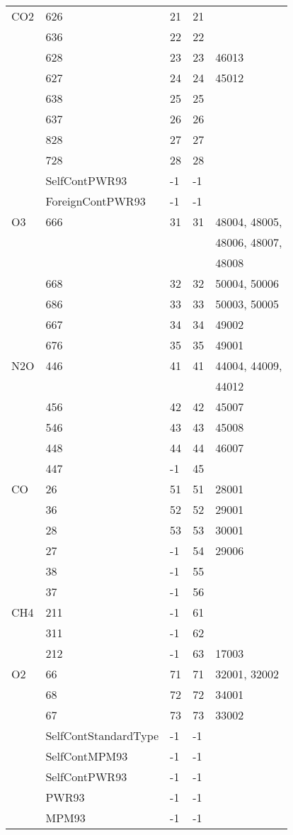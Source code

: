 \begin{longtable}{lllll}
\hline                  
  CO2& 626&  21&    21&\\
     & 636&  22&    22&\\
     & 628&  23&    23&  46013\\
     & 627&  24&    24&  45012\\
     & 638&  25&    25&\\
     & 637&  26&    26&\\
     & 828&  27&    27&\\
     & 728&  28&    28&\\
     &SelfContPWR93&    -1&-1&\\
     &ForeignContPWR93& -1&-1&\\
\hline                  
  O3& 666&  31&    31&  48004, 48005,\\
    &    &    &      &  48006, 48007,\\
    &    &    &      &  48008\\
    & 668&  32&    32&  50004, 50006\\
    & 686&  33&    33&  50003, 50005\\
    & 667&  34&    34&  49002\\
    & 676&  35&    35&  49001\\
\hline                  
  N2O& 446&  41&    41&  44004, 44009,\\
     &    &    &      &  44012\\
     & 456&  42&    42&  45007\\
     & 546&  43&    43&  45008\\
     & 448&  44&    44&  46007\\
     & 447&  -1&    45&\\
\hline                   
  CO&   26&  51&    51&  28001\\
    & 36&  52&    52&  29001\\
    & 28&  53&    53&  30001\\
    & 27&  -1&    54&  29006\\
    & 38&  -1&    55&\\
    & 37&  -1&    56&\\
\hline                  
  CH4& 211&  -1&    61&\\
     & 311&  -1&    62&\\
     & 212&  -1&    63&  17003\\
\hline                  
  O2& 66&  71&    71&  32001, 32002\\
    & 68&  72&    72&  34001\\
    & 67&  73&    73&  33002\\
    &SelfContStandardType&   -1        &-1&     \\
    &SelfContMPM93&          -1        &-1&     \\
    &SelfContPWR93&          -1        &-1&     \\
    &PWR93&                  -1        &-1&     \\ 
    &MPM93&                  -1        &-1&     \\





\end{longtable}
